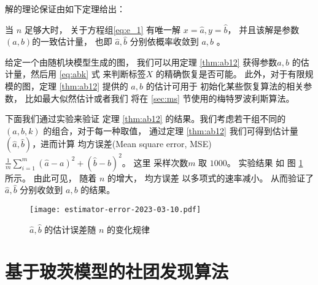 解的理论保证由如下定理给出：
\begin{theorem}\label{thm:ab12}
当 $n$ 足够大时，
关于方程组\eqref{eq:e_1}
有唯一解 $x=\hat{a}, y=\hat{b}$，
并且该解是参数$(a,b)$的一致估计量，
也即 $\hat{a}, \hat{b}$ 
分别依概率收敛到 $a,b$ 。
\end{theorem}
给定一个由随机块模型生成的图，
我们可以用定理 \ref{thm:ab12} 获得参数$a,b$ 
的估计量，然后用 \eqref{eq:abk}
式
来判断标签$X$ 的精确恢复是否可能。
此外，对于有限规模的图，定理 \ref{thm:ab12} 提供的 $a,b$ 的估计可用于
初始化某些恢复算法的相关参数，
比如最大似然估计或者我们
将在 \ref{sec:ms} 节使用的梅特罗波利斯算法。

下面我们通过实验来验证
定理 \ref{thm:ab12} 的结果。我们考虑若干组不同的
$(a,b,k)$ 的组合，对于每一种取值，
通过定理 \ref{thm:ab12} 我们可得到估计量
$(\hat{a}, \hat{b})$，进而计算
均方误差(Mean square error, MSE)
$\frac{1}{m} \sum_{i=1}^m (\hat{a}-a)^2 + (\hat{b}-b)^2$。
这里  采样次数$m$ 取 $1000$。
实验结果 如
图 \ref{fig:estimator} 所示。
由此可见， 随着 $n$ 的增大，
均方误差 以多项式的速率减小。
从而验证了 $\hat{a}, \hat{b}$ 分别收敛到 $a,b$ 
的结果。

\begin{figure}[ht!]
	\centering
		\texttt{[image: estimator-error-2023-03-10.pdf]}
		\caption{ $\hat{a}, \hat{b}$ 的估计误差随
		$n$ 的变化规律 }\label{fig:estimator}
\end{figure}

\section{基于玻茨模型的社团发现算法}\label{sec:potts}

